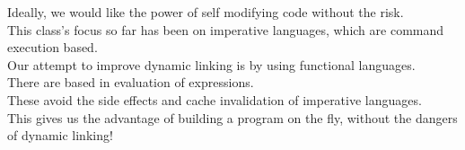 \documentclass[../../lecture_notes.tex]{subfiles}
\begin{document}
Ideally, we would like the power of self modifying code without the risk.
\\
This class's focus so far has been on imperative languages, which are command execution based.\\
Our attempt to improve dynamic linking is by using functional languages.\\
	\indent There are based in evaluation of expressions.\\
	\indent These avoid the side effects and cache invalidation of imperative languages.\\
This gives us the advantage of building a program on the fly, without the dangers of dynamic linking!
\end{document}
